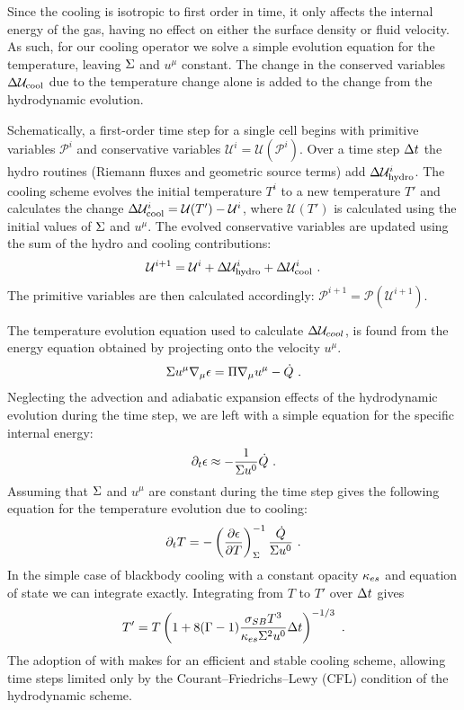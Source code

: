 Since the cooling is isotropic to first order in time, it only affects the internal energy of the gas, having no effect on either the surface density or fluid velocity.  As such, for our cooling operator we solve a simple evolution equation for the temperature, leaving $\Sigma$ and $u^\mu$ constant.  The change in the conserved variables $\Delta \mathcal{U}_\text{cool}$ due to the temperature change alone is added to the change from the hydrodynamic evolution.

Schematically, a first-order time step for a single cell begins with primitive variables $\mathcal{P}^i$ and conservative variables $\mathcal{U}^i = \mathcal{U}(\mathcal{P}^i)$.  Over a time step $\Delta t$ the hydro routines (Riemann fluxes and geometric source terms) add $\Delta \mathcal{U}^i_\text{hydro}$.  The cooling scheme evolves the initial temperature $T^i$ to a new temperature $T'$ and calculates the change $\Delta \mathcal{U}^i_\text{cool} = \mathcal{U}(T') - \mathcal{U}^i$, where $\mathcal{U}(T')$ is calculated using the initial values of $\Sigma$ and $u^\mu$.  The evolved conservative variables are updated using the sum of the hydro and cooling contributions: 
\begin{equation}
	\mathcal{U}^{i+1} = \mathcal{U}^i + \De \mathcal{U}^i_\text{hydro} + \De \mathcal{U}^i_\text{cool} \ . \eqlabel{opsplitU}
\end{equation}
The primitive variables are then calculated accordingly: $\mathcal{P}^{i+1} = \mathcal{P}(\mathcal{U}^{i+1})$.

The temperature evolution equation used to calculate $\Delta \mathcal{U}_{cool}$, is found from the energy equation obtained by projecting  onto the velocity $u^\mu$.
\begin{equation}
	\Sigma u^\mu \nabla_\mu \epsilon = \Pi \nabla_\mu u^\mu - \dot{Q} \ .
\end{equation}
Neglecting the advection and adiabatic expansion effects of the hydrodynamic evolution during the time step, we are left with a simple equation for the specific internal energy:
\begin{equation}
	\pd_t \eps \approx - \frac{1}{\Sig u^0} \dot{Q} \ .
\end{equation}
Assuming that $\Sigma$ and $u^\mu$ are constant during the time step gives the following equation for the temperature evolution due to cooling:
\begin{equation}
	\pd_t T = - \left(\frac{\pd \eps}{\pd T}\right)_{\Sig}^{-1} \frac{\dot{Q}}{\Sig u^0} \ . \eqlabel{Tevolution}
\end{equation}
In the simple case of blackbody cooling  with a constant opacity $\kappa_{es}$ and equation of state  we can integrate  exactly.  Integrating from $T$ to $T'$ over $\Delta t$ gives
\begin{equation}
	T' = T \left( 1 + 8 (\Gam-1) \frac{\sig_{SB} T^3}{\ka_{es}\Sig^2 u^0} \De t \right)^{-1/3} \ . \eqlabel{Tsolution}
\end{equation}
The adoption of  with  makes for an efficient and stable cooling scheme, allowing time steps limited only by the Courant--Friedrichs--Lewy (CFL) condition of the hydrodynamic scheme.


